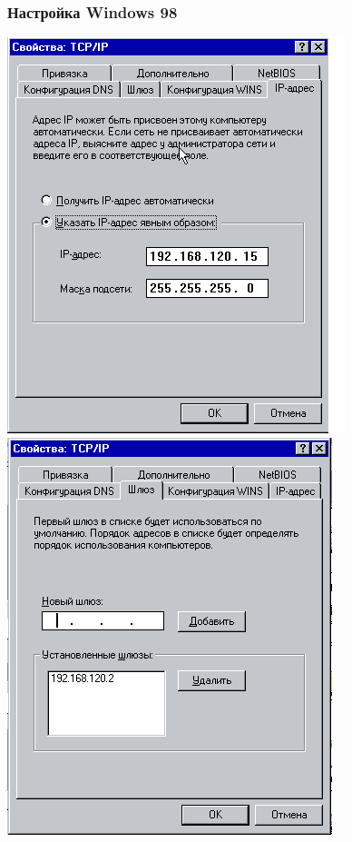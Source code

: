 \documentclass[9pt, compress]{beamer}
\begin{document}
\begin{frame}
\frametitle{Настройка Windows 98}
\begin{center}  
	\includegraphics[width=.51\textwidth]{img/win98_1}
	\includegraphics[width=.48\textwidth]{img/win98_2}
\end{center}
\end{frame}
\end{document}
